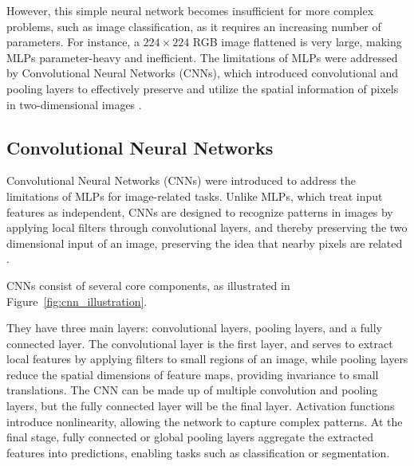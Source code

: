 However, this simple neural network becomes insufficient for more complex problems, such as image classification, as it requires an increasing number of parameters. For instance, a $224\times 224$ RGB image flattened is very large, making MLPs parameter-heavy and inefficient. The limitations of MLPs were addressed by Convolutional Neural Networks (CNNs), which introduced convolutional and pooling layers to effectively preserve and utilize the spatial information of pixels in two-dimensional images \cite{zhang2023dive}.



\subsection{Convolutional Neural Networks}
\label{sec:CNNs}
Convolutional Neural Networks (CNNs) \cite{lecun1995} were introduced to address the limitations of MLPs for image-related tasks. Unlike MLPs, which treat input features as independent, CNNs are designed to recognize patterns in images by applying local filters through convolutional layers, and thereby preserving the two dimensional input of an image, preserving the idea that nearby pixels are related \cite{lecun1998,NIPS2012_c399862d,zhang2023dive}. 

CNNs consist of several core components, as illustrated in Figure~\ref{fig:cnn_illustration}. 

They have three main layers: convolutional layers, pooling layers, and a fully connected layer. The convolutional layer is the first layer, and serves to extract local features by applying filters to small regions of an image, while pooling layers reduce the spatial dimensions of feature maps, providing invariance to small translations. The CNN can be made up of multiple convolution and pooling layers, but the fully connected layer will be the final layer. Activation functions introduce nonlinearity, allowing the network to capture complex patterns. At the final stage, fully connected or global pooling layers aggregate the extracted features into predictions, enabling tasks such as classification or segmentation.



